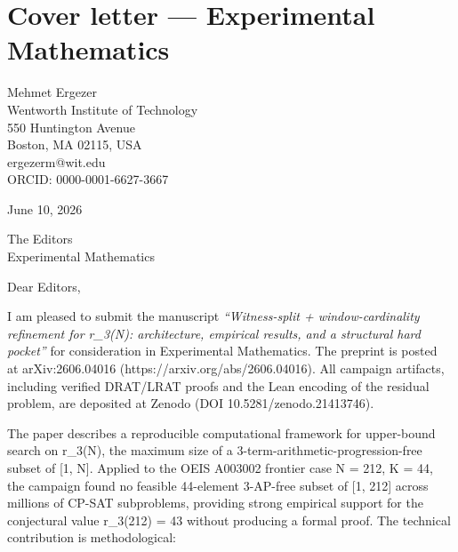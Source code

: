 \documentclass[
]{article}
\author{}
\date{}
\begin{document}
\section{Cover letter --- Experimental
Mathematics}\label{cover-letter-experimental-mathematics}

Mehmet Ergezer\\
Wentworth Institute of Technology\\
550 Huntington Avenue\\
Boston, MA 02115, USA\\
ergezerm@wit.edu\\
ORCID: 0000-0001-6627-3667

June 10, 2026

The Editors\\
Experimental Mathematics

Dear Editors,

I am pleased to submit the manuscript \emph{``Witness-split +
window-cardinality\\
refinement for r\_3(N): architecture, empirical results, and a
structural hard\\
pocket''} for consideration in Experimental Mathematics. The preprint is
posted\\
at arXiv:2606.04016 (https://arxiv.org/abs/2606.04016). All campaign
artifacts,\\
including verified DRAT/LRAT proofs and the Lean encoding of the
residual\\
problem, are deposited at Zenodo (DOI 10.5281/zenodo.21413746).

The paper describes a reproducible computational framework for
upper-bound\\
search on r\_3(N), the maximum size of a
3-term-arithmetic-progression-free\\
subset of {[}1, N{]}. Applied to the OEIS A003002 frontier case N = 212,
K = 44,\\
the campaign found no feasible 44-element 3-AP-free subset of {[}1,
212{]} across\\
millions of CP-SAT subproblems, providing strong empirical support for
the\\
conjectural value r\_3(212) = 43 without producing a formal proof. The
technical\\
contribution is methodological:
\end{document}
